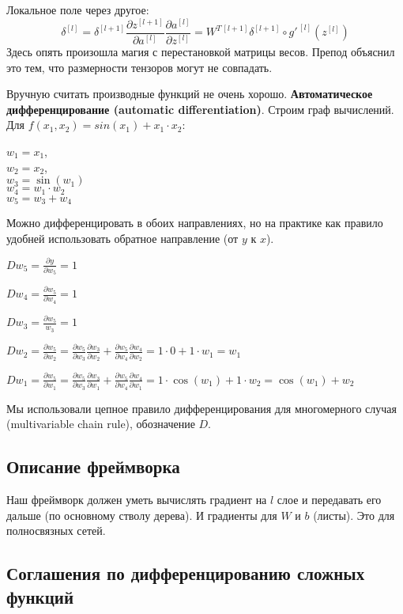 Локальное поле через другое:
\[
    \delta^{[l]} = \delta^{[l+1]} \frac{\partial z^{[l+1]}}{\partial a^{[l]}}
    \frac{\partial a^{[l]}}{\partial z^{[l]}} = W^{T\,[l+1]} \delta^{[l+1]}
    \circ g'^{\,[l]}(z^{[l]})
\]
Здесь опять произошла магия с перестановкой матрицы весов. Препод объяснил это
тем, что размерности тензоров могут не совпадать.

Вручную считать производные функций не очень хорошо. \textbf{Автоматическое
дифференцирование (automatic differentiation)}. Строим граф вычислений. Для $f(x_1, x_2) = sin(x_1) + x_1
\cdot x_2$:

$w_1 = x_1$,\\
$w_2 = x_2$,\\
$w_3 = \sin(w_1)$\\
$w_4 = w_1 \cdot w_2$\\
$w_5 = w_3 + w_4$

Можно дифференцировать в обоих направлениях, но на практике как правило удобней
использовать обратное направление (от $y$ к $x$).

$D w_5 = \frac{\partial y}{\partial w_5} = 1$

$D w_4 = \frac{\partial w_5}{\partial w_4} = 1$

$D w_3 = \frac{\partial w_5}{w_3} = 1$

$
D w_2 = \frac{\partial w_5}{\partial w_2} =
\frac{\partial w_5}{\partial w_3} \frac{\partial w_3}{\partial w_2} +
\frac{\partial w_5}{\partial w_4} \frac{\partial w_4}{\partial w_2} =
1 \cdot 0 + 1 \cdot w_1 =
w_1
$

$
D w_1 = \frac{\partial w_5}{\partial w_1} =
\frac{\partial w_5}{\partial w_3} \frac{\partial w_3}{\partial w_1} +
\frac{\partial w_5}{\partial w_4} \frac{\partial w_4}{\partial w_1} =
1 \cdot \cos(w_1) + 1 \cdot w_2 = \cos(w_1) + w_2
$


Мы использовали цепное правило дифференцирования для многомерного случая
(multivariable chain rule), обозначение $D$. 




\subsection{Описание фреймворка}

Наш фреймворк должен уметь вычислять градиент на $l$ слое и передавать его
дальше (по основному стволу дерева). И градиенты для $W$ и $b$ (листы). Это для полносвязных сетей.

\subsection{Соглашения по дифференцированию сложных функций}

